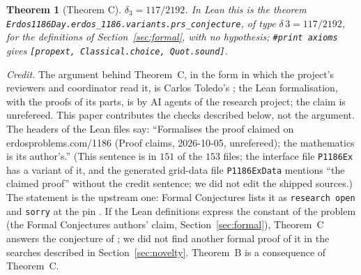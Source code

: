 \documentclass[11pt]{amsart}
\newtheorem{theorem}{Theorem}[section]
\theoremstyle{remark}
\newcommand{\lean}[1]{\texttt{#1}}
\begin{document}
\begin{theorem}[Theorem C]\label{thm:C}
$\delta_3=117/2192$. In Lean this is the theorem \textup{\lean{Erdos1186Day.erdos\_1186.variants.prs\_conjecture}}, of type $\delta\,3=117/2192$, for the definitions of Section~\ref{sec:formal}, with no hypothesis; \textup{\lean{\#print axioms}} gives \textup{\lean{[propext, Classical.choice, Quot.sound]}}.
\end{theorem}
\emph{Credit.} The argument behind Theorem~C, in the form in which the project's reviewers and coordinator read it, is Carlos Toledo's \cite{Toledo26}; the Lean formalisation, with the proofs of its parts, is by AI agents of the research project; the claim is unrefereed. This paper contributes the checks described below, not the argument. The headers of the Lean files say: ``Formalises the proof claimed on erdosproblems.com/1186 (Proof claims, 2026-10-05, unrefereed); the mathematics is its author's.'' (This sentence is in $151$ of the $153$ files; the interface file \texttt{P1186Ex} has a variant of it, and the generated grid-data file \texttt{P1186ExData} mentions ``the claimed proof'' without the credit sentence; we did not edit the shipped sources.) The statement is the upstream one: Formal Conjectures lists it as \texttt{research open} and \texttt{sorry} at the pin \cite{FC}. If the Lean definitions express the constant of the problem (the Formal Conjectures authors' claim, Section~\ref{sec:formal}), Theorem~C answers the conjecture of \cite{PRS08}; we did not find another formal proof of it in the searches described in Section~\ref{sec:novelty}. Theorem~B is a consequence of Theorem~C.
\end{document}
